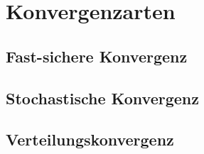 \chapter{Konvergenzarten}

\section{Fast-sichere Konvergenz}
\section{Stochastische Konvergenz}
\section{Verteilungskonvergenz}